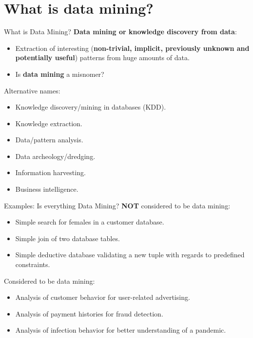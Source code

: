 \section{What is data mining?}

\begin{frame}{What is Data Mining?}
	\textbf{Data mining or knowledge discovery from data}:
	\begin{itemize}
		\item Extraction of interesting (\textbf{non-trivial, implicit, 
		previously unknown and potentially useful}) patterns from huge amounts 
		of data.
		\item Is \textbf{data mining} a misnomer?
	\end{itemize}
	Alternative names:
	\begin{itemize}
		\item Knowledge discovery/mining in databases (KDD).
		\item Knowledge extraction.
		\item Data/pattern analysis.
		\item Data archeology/dredging.
		\item Information harvesting.
		\item Business intelligence.
	\end{itemize}
\end{frame}

\begin{frame}{Examples: Is everything Data Mining?}
	\textbf{NOT} considered to be data mining:
	\begin{itemize}
		\item Simple search for females in a customer database.
		\item Simple join of two database tables.
		\item Simple deductive database validating a new tuple with regards to 
		predefined constraints.
	\end{itemize}
	Considered to be data mining:
	\begin{itemize}
		\item Analysis of customer behavior for user-related advertising.
		\item Analysis of payment histories for fraud detection.
		\item Analysis of infection behavior for better understanding of a 
		pandemic.
	\end{itemize}
\end{frame}

